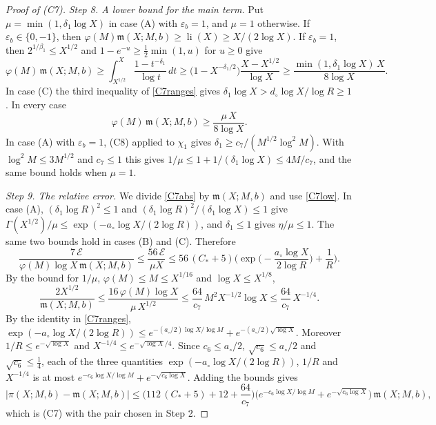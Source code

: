 \begin{proof}[Proof of (C7)]
\emph{Step 8. A lower bound for the main term.} Put $\mu=\min(1,\delta_1\log X)$ in case (A) with $\varepsilon_b=1$, and $\mu=1$ otherwise. If $\varepsilon_b\in\{0,-1\}$, then $\varphi(M)\mathfrak m(X;M,b)\ge\operatorname{li}(X)\ge X/(2\log X)$. If $\varepsilon_b=1$, then $2^{1/\beta_1}\le X^{1/2}$ and $1-e^{-u}\ge\frac12\min(1,u)$ for $u\ge0$ give
\[
\varphi(M)\,\mathfrak m(X;M,b)\ge\int_{X^{1/2}}^X\frac{1-t^{-\delta_1}}{\log t}\,dt\ge\big(1-X^{-\delta_1/2}\big)\frac{X-X^{1/2}}{\log X}\ge\frac{\min(1,\delta_1\log X)\,X}{8\log X}.
\]
In case (C) the third inequality of \eqref{C7ranges} gives $\delta_1\log X>d_\circ\log X/\log R\ge1$. In every case
\begin{equation}\label{C7low}
\varphi(M)\,\mathfrak m(X;M,b)\ge\frac{\mu\,X}{8\log X}.
\end{equation}
In case (A) with $\varepsilon_b=1$, (C8) applied to $\chi_1$ gives $\delta_1\ge c_7/(M^{1/2}\log^2M)$. With $\log^2M\le3M^{1/2}$ and $c_7\le1$ this gives $1/\mu\le1+1/(\delta_1\log X)\le4M/c_7$, and the same bound holds when $\mu=1$.

\emph{Step 9. The relative error.} We divide \eqref{C7abs} by $\mathfrak m(X;M,b)$ and use \eqref{C7low}. In case (A), $(\delta_1\log R)^2\le1$ and $(\delta_1\log R)^2/(\delta_1\log X)\le1$ give $\Gamma(X^{1/2})/\mu\le\exp(-a_\circ\log X/(2\log R))$, and $\delta_1\le1$ gives $\eta/\mu\le1$. The same two bounds hold in cases (B) and (C). Therefore
\[
\frac{7\,\mathcal E}{\varphi(M)\log X\,\mathfrak m(X;M,b)}\le\frac{56\,\mathcal E}{\mu X}\le56\,(C_\ast+5)\Big(\exp\Big(-\frac{a_\circ\log X}{2\log R}\Big)+\frac1R\Big).
\]
By the bound for $1/\mu$, $\varphi(M)\le M\le X^{1/16}$ and $\log X\le X^{1/8}$,
\[
\frac{2X^{1/2}}{\mathfrak m(X;M,b)}\le\frac{16\,\varphi(M)\log X}{\mu\,X^{1/2}}\le\frac{64}{c_7}\,M^2X^{-1/2}\log X\le\frac{64}{c_7}\,X^{-1/4}.
\]
By the identity in \eqref{C7ranges}, $\exp(-a_\circ\log X/(2\log R))\le e^{-(a_\circ/2)\log X/\log M}+e^{-(a_\circ/2)\sqrt{\log X}}$. Moreover $1/R\le e^{-\sqrt{\log X}}$ and $X^{-1/4}\le e^{-\sqrt{\log X}/4}$. Since $c_6\le a_\circ/2$, $\sqrt{c_6}\le a_\circ/2$ and $\sqrt{c_6}\le\frac14$, each of the three quantities $\exp(-a_\circ\log X/(2\log R))$, $1/R$ and $X^{-1/4}$ is at most $e^{-c_6\log X/\log M}+e^{-\sqrt{c_6\log X}}$. Adding the bounds gives
\[
\big\lvert\pi(X;M,b)-\mathfrak m(X;M,b)\big\rvert\le\Big(112\,(C_\ast+5)+12+\frac{64}{c_7}\Big)\Big(e^{-c_6\log X/\log M}+e^{-\sqrt{c_6\log X}}\Big)\,\mathfrak m(X;M,b),
\]
which is (C7) with the pair chosen in Step 2.
\end{proof}

